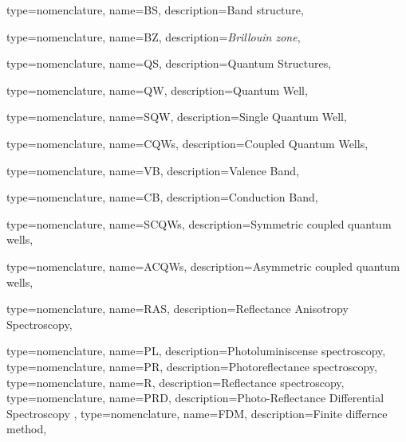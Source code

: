 
{type={nomenclature},
name={BS},
description={Band structure},
}

{type={nomenclature},
name={BZ},
description={\emph{Brillouin zone}},
}

{type={nomenclature},
name={QS},
description={Quantum Structures},
}

{type={nomenclature},
name={QW},
description={Quantum Well},
}

{type={nomenclature},
name={SQW},
description={Single Quantum Well},
}

{type={nomenclature},
name={CQWs},
description={Coupled Quantum Wells},
}

{type={nomenclature},
name={VB},
description={Valence Band},
}


{type={nomenclature},
name={CB},
description={Conduction Band},
}

{type={nomenclature},
name={SCQWs},
description={Symmetric coupled quantum wells},
}

{type={nomenclature},
name={ACQWs},
description={Asymmetric coupled quantum wells},
}

{type={nomenclature},
name={RAS},
description={Reflectance Anisotropy Spectroscopy},
}

{type={nomenclature},
name={PL},
description={Photoluminiscense spectroscopy},
}
{type={nomenclature},
name={PR},
description={Photoreflectance spectroscopy},
}
{type={nomenclature},
name={R},
description={Reflectance spectroscopy},
}
{type={nomenclature},
name={PRD},
description={Photo-Reflectance Differential Spectroscopy },
}
{type={nomenclature},
name={FDM},
description={Finite differnce method},
}

